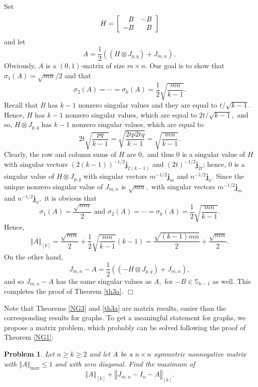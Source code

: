 \documentclass[12pt]{article}%
\newtheorem{problem}[theorem]{Problem}
\newenvironment{proof}[1][Proof]{\noindent{\textbf {#1}  }}  {\hfill$\Box$\bigskip}
\begin{document}
\begin{proof}
Set
\[
H=\left[
\begin{array}
[c]{rr}%
B & -B\\
-B & B
\end{array}
\right]
\]
and let
\[
A=\frac{1}{2}\left(  \left(  H\otimes J_{p,q}\right)  +J_{m,n}\right)  ,
\]
Obviously, $A$ is a $\left(  0,1\right)  $-matrix of size $m\times n.$ Our
goal is to show that $\sigma_{1}\left(  A\right)  =\sqrt{mn}/2$ and that%
\[
\sigma_{2}\left(  A\right)  =\cdots=\sigma_{k}\left(  A\right)  =\frac{1}%
{2}\sqrt{\frac{mn}{k-1}}.
\]
Recall that $B$ has $k-1$ nonzero singular values and they are equal to
$t/\sqrt{k-1}.$ Hence, $H$ has $k-1$ nonzero singular values, which are equal
to $2t/\sqrt{k-1},$ and so, $H\otimes J_{p,q}$ has $k-1$ nonzero singular
values, which are equal to
\[
2t\sqrt{\frac{pq}{k-1}}=\sqrt{\frac{2tp2tq}{k-1}}=\sqrt{\frac{mn}{k-1}}.
\]
Clearly, the row and column sums of $H$ are $0,$ and thus $0$ is a singular
value of $H$ with singular vectors $\left(  2\left(  k-1\right)  \right)
^{-1/2}\mathbf{j}_{2\left(  k-1\right)  }$ and $\left(  2t\right)
^{-1/2}\mathbf{j}_{2t}$; hence, $0$ is a singular value of $H\otimes J_{p,q}$
with singular vectors $m^{-1/2}\mathbf{j}_{m}$ and $n^{-1/2}\mathbf{j}_{n}.$
Since the unique nonzero singular value of $J_{m,n}$ is $\sqrt{mn},$ with
singular vectors $m^{-1/2}\mathbf{j}_{m}$ and $n^{-1/2}\mathbf{j}_{n},$ it is
obvious that
\[
\sigma_{1}\left(  A\right)  =\frac{\sqrt{mn}}{2}\text{ \ and \ }\sigma
_{2}\left(  A\right)  =\cdots=\sigma_{k}\left(  A\right)  =\frac{1}{2}%
\sqrt{\frac{mn}{k-1}}.
\]
Hence,
\[
\left\Vert A\right\Vert _{\left[  k\right]  }=\frac{\sqrt{mn}}{2}+\frac{1}%
{2}\sqrt{\frac{mn}{k-1}}\left(  k-1\right)  =\frac{\sqrt{\left(  k-1\right)
mn}}{2}+\frac{\sqrt{mn}}{2}.
\]
On the other hand,%
\[
J_{m,n}-A=\frac{1}{2}\left(  \left(  -H\otimes J_{p,q}\right)  +J_{m,n}%
\right)  ,
\]
and so $J_{m,n}-A$ has the same singular values as $A,$ for $-B\in
\mathbb{S}_{k-1}$ as well. This completes the proof of Theorem \ref{th3a}.
\end{proof}

Note that Theorems \ref{NG3} and \ref{th3a} are matrix results, easier than
the corresponding results for graphs. To get a meaningful statement for
graphs, we propose a matrix problem, which probably can be solved following
the proof of Theorem \ref{NG1}:

\begin{problem}
\label{ps}Let $n\geq k\geq2$ and let $A$ be a $n\times n$ symmetric
nonnegative matrix with $\left\Vert A\right\Vert _{\max}\leq1$ and with zero
diagonal. Find the maximum of
\[
\left\Vert A\right\Vert _{\left[  k\right]  }+\left\Vert J_{m,n}%
-I_{n}-A\right\Vert _{\left[  k\right]  }.
\]

\end{problem}
\end{document}

